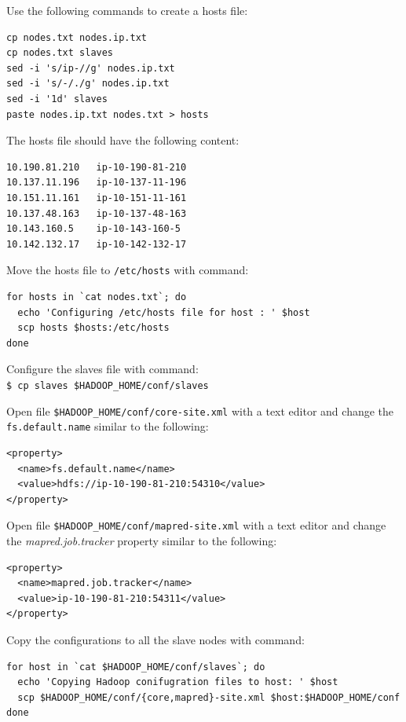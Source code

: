 Use the following commands to create a hosts file:
\lstset{style=bashstyle}
\begin{lstlisting}
cp nodes.txt nodes.ip.txt
cp nodes.txt slaves
sed -i 's/ip-//g' nodes.ip.txt
sed -i 's/-/./g' nodes.ip.txt
sed -i '1d' slaves
paste nodes.ip.txt nodes.txt > hosts
\end{lstlisting}

The hosts file should have the following content:
\lstset{style=bashstyle}
\begin{lstlisting}
10.190.81.210   ip-10-190-81-210
10.137.11.196   ip-10-137-11-196
10.151.11.161   ip-10-151-11-161
10.137.48.163   ip-10-137-48-163
10.143.160.5    ip-10-143-160-5
10.142.132.17   ip-10-142-132-17
\end{lstlisting}

Move the hosts file to \verb|/etc/hosts| with command:
\lstset{style=bashstyle}
\begin{lstlisting}
for hosts in `cat nodes.txt`; do
  echo 'Configuring /etc/hosts file for host : ' $host
  scp hosts $hosts:/etc/hosts
done
\end{lstlisting}

Configure the slaves file with command: \\
\verb|$ cp slaves $HADOOP_HOME/conf/slaves|

Open file \verb|$HADOOP_HOME/conf/core-site.xml| with a text editor and change the \verb|fs.default.name| similar to the following:
\lstset{style=bashstyle}
\begin{lstlisting}
<property>
  <name>fs.default.name</name>
  <value>hdfs://ip-10-190-81-210:54310</value>
</property>
\end{lstlisting}

Open file \verb|$HADOOP_HOME/conf/mapred-site.xml| with a text editor and change the \emph{mapred.job.tracker} property similar to the following:
\lstset{style=bashstyle}
\begin{lstlisting}
<property>
  <name>mapred.job.tracker</name>
  <value>ip-10-190-81-210:54311</value>
</property>
\end{lstlisting}

Copy the configurations to all the slave nodes with command: 
\lstset{style=bashstyle}
\begin{lstlisting}
for host in `cat $HADOOP_HOME/conf/slaves`; do
  echo 'Copying Hadoop conifugration files to host: ' $host
  scp $HADOOP_HOME/conf/{core,mapred}-site.xml $host:$HADOOP_HOME/conf
done
\end{lstlisting}

